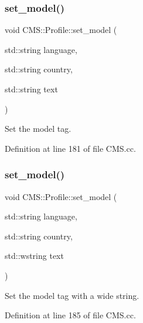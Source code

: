 \subsubsection{\texorpdfstring{set\+\_\+model()}{set\_model()}\hspace{0.1cm}{\footnotesize\ttfamily [1/2]}}
{\footnotesize\ttfamily void C\+M\+S\+::\+Profile\+::set\+\_\+model (\begin{DoxyParamCaption}\item[{std\+::string}]{language,  }\item[{std\+::string}]{country,  }\item[{std\+::string}]{text }\end{DoxyParamCaption})}



Set the model tag. 



Definition at line 181 of file C\+M\+S.\+cc.

\mbox{\label{class_c_m_s_1_1_profile_a9cf62798d019c1337df37e52b4b84e5a}} 
\subsubsection{\texorpdfstring{set\+\_\+model()}{set\_model()}\hspace{0.1cm}{\footnotesize\ttfamily [2/2]}}
{\footnotesize\ttfamily void C\+M\+S\+::\+Profile\+::set\+\_\+model (\begin{DoxyParamCaption}\item[{std\+::string}]{language,  }\item[{std\+::string}]{country,  }\item[{std\+::wstring}]{text }\end{DoxyParamCaption})}



Set the model tag with a wide string. 



Definition at line 185 of file C\+M\+S.\+cc.

\mbox{\label{class_c_m_s_1_1_profile_a51111f314db7bfda93f5388f9eee551c}} 
